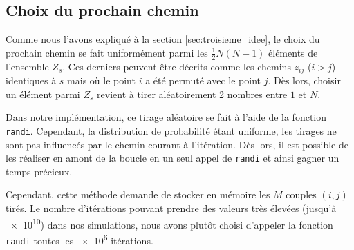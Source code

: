 \documentclass[a4paper, 12pt]{report}
\begin{document}
	\subsection{Choix du prochain chemin}
	Comme nous l'avons expliqué à la section \ref{sec:troisieme_idee}, le choix du prochain chemin se fait uniformément parmi les $\frac{1}{2} N (N - 1)$ éléments de l'ensemble $Z_s$. Ces derniers peuvent être décrits comme les chemins $z_{ij}$ ($i > j$) identiques à $s$ mais où le point $i$ a été permuté avec le point $j$. Dès lors, choisir un élément parmi $Z_s$ revient à tirer aléatoirement 2 nombres entre $1$ et $N$. \par
	Dans notre implémentation, ce tirage aléatoire se fait à l'aide de la fonction \texttt{randi}. Cependant, la distribution de probabilité étant uniforme, les tirages ne sont pas influencés par le chemin courant à l'itération. Dès lors, il est possible de les réaliser en amont de la boucle en un seul appel de \texttt{randi} et ainsi gagner un temps précieux. \par
	Cependant, cette méthode demande de stocker en mémoire les $M$ couples $(i, j)$ tirés. Le nombre d'itérations pouvant prendre des valeurs très élevées (jusqu'à \num{e10}) dans nos simulations, nous avons plutôt choisi d'appeler la fonction \texttt{randi} toutes les \num{e6} itérations.
\end{document}
